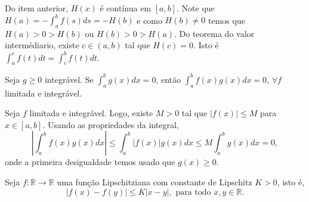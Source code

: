 \documentclass[11pt]{exam}
\begin{document}
\begin{questions}
     \begin{solution}
     Do item anterior, $H(x)$ é contínua em $[a,b]$.
     Note que $H(a)=-\int_{a}^{b}f(s)ds=-H(b)$ e como $H(b)\neq0$
     temos que $H(a)>0>H(b)$ ou $H(b)>0>H(a)$. Do teorema do valor intermédiario, existe $c \in (a, b)$ tal que $H(c)=0$. Isto é 
     $\int_{a}^{c}f(t)dt=\int_{c}^{b}f(t)dt$.
     \end{solution}
   \question[20] Seja $g\geq 0$ integrável. Se 
   $\int_{a}^{b}g(x)dx=0$, então  
   $\int_{a}^{b}f(x)g(x)dx=0$, $\forall f$ limitada e integrável.
     \begin{solution}
     Seja $f$ limitada e integrável. Logo, existe $M>0$ tal que 
     $|f(x)|\leq M$ para $x \in [a,b]$.
     Usando as propriedades da integral, 
     $$|\int_{a}^{b}f(x)g(x)dx|\leq \int_{a}^{b}|f(x)|g(x)dx \leq 
     M \int_{a}^{b}g(x)dx=0, $$
     onde a primeira desigualdade temos usado que $g(x)\geq 0$.
     \end{solution}
  \question
  Seja $f:\mathbb{R} \rightarrow \mathbb{R}$ uma função Lipschitziana com constante de Lipschitz $K>0$, isto é, 
$$ |f(x)-f(y)|\leq K|x-y|, \text{ para todo } x, y \in \mathbb{R}.$$  
  \begin{parts}

\end{parts}
\end{questions}
\end{document}
